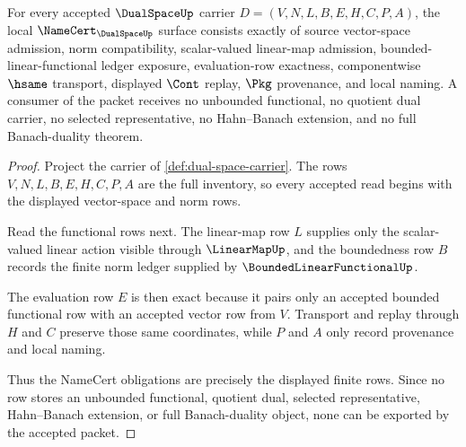 \begin{theorem}
\label{thm:dual-space-namecert-obligations}
For every accepted $\DualSpaceUp$ carrier $D=(V,N,L,B,E,H,C,P,A)$, the local $\NameCert_{\DualSpaceUp}$ surface consists exactly of source vector-space admission, norm compatibility, scalar-valued linear-map admission, bounded-linear-functional ledger exposure, evaluation-row exactness, componentwise $\hsame$ transport, displayed $\Cont$ replay, $\Pkg$ provenance, and local naming. A consumer of the packet receives no unbounded functional, no quotient dual carrier, no selected representative, no Hahn--Banach extension, and no full Banach-duality theorem.
\end{theorem}
\begin{proof}
Project the carrier of \autoref{def:dual-space-carrier}. The rows $V,N,L,B,E,H,C,P,A$ are the full inventory, so every accepted read begins with the displayed vector-space and norm rows.

Read the functional rows next. The linear-map row $L$ supplies only the scalar-valued linear action visible through $\LinearMapUp$, and the boundedness row $B$ records the finite norm ledger supplied by $\BoundedLinearFunctionalUp$.

The evaluation row $E$ is then exact because it pairs only an accepted bounded functional row with an accepted vector row from $V$. Transport and replay through $H$ and $C$ preserve those same coordinates, while $P$ and $A$ only record provenance and local naming.

Thus the NameCert obligations are precisely the displayed finite rows. Since no row stores an unbounded functional, quotient dual, selected representative, Hahn--Banach extension, or full Banach-duality object, none can be exported by the accepted packet.
\end{proof}



